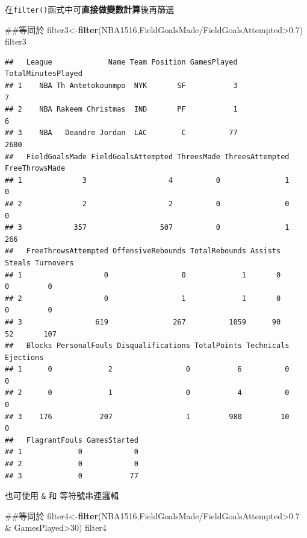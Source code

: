 \documentclass[]{book}
\newenvironment{Shaded}{\begin{snugshade}}{\end{snugshade}}
\newcommand{\KeywordTok}[1]{\textcolor[rgb]{0.13,0.29,0.53}{\textbf{{#1}}}}
\newcommand{\DecValTok}[1]{\textcolor[rgb]{0.00,0.00,0.81}{{#1}}}
\newcommand{\FloatTok}[1]{\textcolor[rgb]{0.00,0.00,0.81}{{#1}}}
\newcommand{\StringTok}[1]{\textcolor[rgb]{0.31,0.60,0.02}{{#1}}}
\newcommand{\NormalTok}[1]{{#1}}
\theoremstyle{definition}
\theoremstyle{definition}
\theoremstyle{remark}
\begin{document}
在\texttt{filter()}函式中可\textbf{直接做變數計算}後再篩選

\begin{Shaded}
\begin{Highlighting}[]
\NormalTok{##等同於}
\NormalTok{filter3<-}\KeywordTok{filter}\NormalTok{(NBA1516,FieldGoalsMade/FieldGoalsAttempted>}\FloatTok{0.7}\NormalTok{)}
\NormalTok{filter3}
\end{Highlighting}
\end{Shaded}

\begin{verbatim}
##   League             Name Team Position GamesPlayed TotalMinutesPlayed
## 1    NBA Th Antetokounmpo  NYK       SF           3                  7
## 2    NBA Rakeem Christmas  IND       PF           1                  6
## 3    NBA   Deandre Jordan  LAC        C          77               2600
##   FieldGoalsMade FieldGoalsAttempted ThreesMade ThreesAttempted FreeThrowsMade
## 1              3                   4          0               1              0
## 2              2                   2          0               0              0
## 3            357                 507          0               1            266
##   FreeThrowsAttempted OffensiveRebounds TotalRebounds Assists Steals Turnovers
## 1                   0                 0             1       0      0         0
## 2                   0                 1             1       0      0         0
## 3                 619               267          1059      90     52       107
##   Blocks PersonalFouls Disqualifications TotalPoints Technicals Ejections
## 1      0             2                 0           6          0         0
## 2      0             1                 0           4          0         0
## 3    176           207                 1         980         10         0
##   FlagrantFouls GamesStarted
## 1             0            0
## 2             0            0
## 3             0           77
\end{verbatim}

也可使用 \texttt{\&} 和 \texttt{\textbar{}}等符號串連邏輯

\begin{Shaded}
\begin{Highlighting}[]
\NormalTok{##等同於}
\NormalTok{filter4<-}\KeywordTok{filter}\NormalTok{(NBA1516,FieldGoalsMade/FieldGoalsAttempted>}\FloatTok{0.7} \NormalTok{&}\StringTok{ }\NormalTok{GamesPlayed>}\DecValTok{30}\NormalTok{)}
\NormalTok{filter4}
\end{Highlighting}
\end{Shaded}
\end{document}
